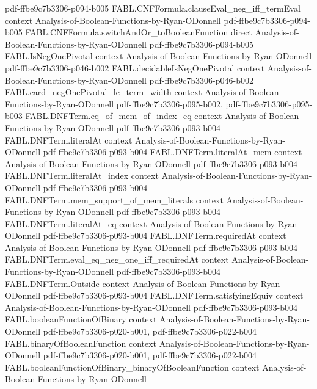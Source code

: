 \begin{theorem}
  {pdf-ffbe9c7b3306-p094-b005}
\proofstep
  {FABL.CNFFormula.clauseEval_neg_iff_termEval}
  {context}
  {Analysis-of-Boolean-Functions-by-Ryan-ODonnell}
  {pdf-ffbe9c7b3306-p094-b005}
\proofstep
  {FABL.CNFFormula.switchAndOr_toBooleanFunction}
  {direct}
  {Analysis-of-Boolean-Functions-by-Ryan-ODonnell}
  {pdf-ffbe9c7b3306-p094-b005}
\proofstep
  {FABL.IsNegOnePivotal}
  {context}
  {Analysis-of-Boolean-Functions-by-Ryan-ODonnell}
  {pdf-ffbe9c7b3306-p046-b002}
\proofstep
  {FABL.decidableIsNegOnePivotal}
  {context}
  {Analysis-of-Boolean-Functions-by-Ryan-ODonnell}
  {pdf-ffbe9c7b3306-p046-b002}
\proofstep
  {FABL.card_negOnePivotal_le_term_width}
  {context}
  {Analysis-of-Boolean-Functions-by-Ryan-ODonnell}
  {pdf-ffbe9c7b3306-p095-b002,
    pdf-ffbe9c7b3306-p095-b003}
\proofstep
  {FABL.DNFTerm.eq_of_mem_of_index_eq}
  {context}
  {Analysis-of-Boolean-Functions-by-Ryan-ODonnell}
  {pdf-ffbe9c7b3306-p093-b004}
\proofstep
  {FABL.DNFTerm.literalAt}
  {context}
  {Analysis-of-Boolean-Functions-by-Ryan-ODonnell}
  {pdf-ffbe9c7b3306-p093-b004}
\proofstep
  {FABL.DNFTerm.literalAt_mem}
  {context}
  {Analysis-of-Boolean-Functions-by-Ryan-ODonnell}
  {pdf-ffbe9c7b3306-p093-b004}
\proofstep
  {FABL.DNFTerm.literalAt_index}
  {context}
  {Analysis-of-Boolean-Functions-by-Ryan-ODonnell}
  {pdf-ffbe9c7b3306-p093-b004}
\proofstep
  {FABL.DNFTerm.mem_support_of_mem_literals}
  {context}
  {Analysis-of-Boolean-Functions-by-Ryan-ODonnell}
  {pdf-ffbe9c7b3306-p093-b004}
\proofstep
  {FABL.DNFTerm.literalAt_eq}
  {context}
  {Analysis-of-Boolean-Functions-by-Ryan-ODonnell}
  {pdf-ffbe9c7b3306-p093-b004}
\proofstep
  {FABL.DNFTerm.requiredAt}
  {context}
  {Analysis-of-Boolean-Functions-by-Ryan-ODonnell}
  {pdf-ffbe9c7b3306-p093-b004}
\proofstep
  {FABL.DNFTerm.eval_eq_neg_one_iff_requiredAt}
  {context}
  {Analysis-of-Boolean-Functions-by-Ryan-ODonnell}
  {pdf-ffbe9c7b3306-p093-b004}
\proofstep
  {FABL.DNFTerm.Outside}
  {context}
  {Analysis-of-Boolean-Functions-by-Ryan-ODonnell}
  {pdf-ffbe9c7b3306-p093-b004}
\proofstep
  {FABL.DNFTerm.satisfyingEquiv}
  {context}
  {Analysis-of-Boolean-Functions-by-Ryan-ODonnell}
  {pdf-ffbe9c7b3306-p093-b004}
\proofstep
  {FABL.booleanFunctionOfBinary}
  {context}
  {Analysis-of-Boolean-Functions-by-Ryan-ODonnell}
  {pdf-ffbe9c7b3306-p020-b001,
    pdf-ffbe9c7b3306-p022-b004}
\proofstep
  {FABL.binaryOfBooleanFunction}
  {context}
  {Analysis-of-Boolean-Functions-by-Ryan-ODonnell}
  {pdf-ffbe9c7b3306-p020-b001,
    pdf-ffbe9c7b3306-p022-b004}
\proofstep
  {FABL.booleanFunctionOfBinary_binaryOfBooleanFunction}
  {context}
  {Analysis-of-Boolean-Functions-by-Ryan-ODonnell}

\end{theorem}

